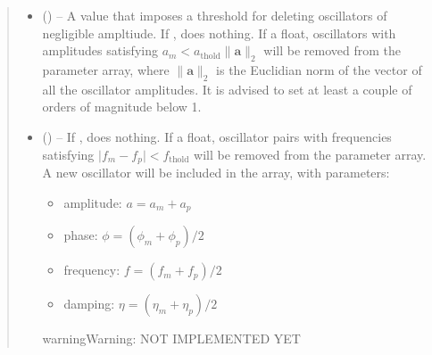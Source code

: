 \documentclass[letterpaper,10pt,english]{sphinxmanual}
\begin{document}
\begin{fulllineitems}
\begin{quote}
\begin{description}
\begin{itemize}
\item {} 
\sphinxAtStartPar
{} (\sphinxstyleliteralemphasis{\sphinxupquote{, }}) – A value that imposes a threshold for deleting oscillators of
negligible ampltiude. If , does nothing. If a float, oscillators
with amplitudes satisfying \(a_m < a_{\mathrm{thold}}
\lVert \boldsymbol{a} \rVert_2\) will be removed from the
parameter array, where \(\lVert \boldsymbol{a} \rVert_2\)
is the Euclidian norm of the vector of all the oscillator amplitudes.
It is advised to set  at least a couple of orders of
magnitude below 1.

\item {} 
\sphinxAtStartPar
{} () – 
\sphinxAtStartPar
If , does nothing. If a float, oscillator pairs with
frequencies satisfying
\(\lvert f_m - f_p \rvert < f_{\mathrm{thold}}\) will be
removed from the parameter array. A new oscillator will be included
in the array, with parameters:
\begin{itemize}
\item {} 
\sphinxAtStartPar
amplitude: \(a = a_m + a_p\)

\item {} 
\sphinxAtStartPar
phase: \(\phi = \left(\phi_m + \phi_p\right) / 2\)

\item {} 
\sphinxAtStartPar
frequency: \(f = \left(f_m + f_p\right) / 2\)

\item {} 
\sphinxAtStartPar
damping: \(\eta = \left(\eta_m + \eta_p\right) / 2\)

\end{itemize}

\begin{sphinxadmonition}{warning}{Warning:}
\sphinxAtStartPar
NOT IMPLEMENTED YET
\end{sphinxadmonition}



\end{itemize}
\end{description}
\end{quote}
\end{fulllineitems}
\end{document}
